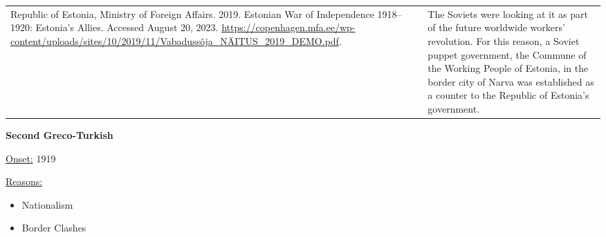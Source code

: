 {\begin{longtable}{p{}p{}}
\\
Republic of Estonia, Ministry of Foreign Affairs. 2019. Estonian War of Independence 1918–1920: Estonia’s Allies. Accessed August 20, 2023. \url{https://copenhagen.mfa.ee/wp-content/uploads/sites/10/2019/11/Vabadussõja_NÄITUS_2019_DEMO.pdf}. & The Soviets were looking at it as part of the future worldwide workers' revolution. For this reason, a Soviet puppet government, the Commune of the Working People of Estonia, in the border city of Narva was established as a counter to the Republic of Estonia's government.
\\
\end{longtable}}
\clearpage
         \textbf{Second Greco-Turkish} 

          \underline{Onset:} 1919         

\underline{Reasons:}
\begin{itemize}
\item Nationalism
\item Border Clashes
\end{itemize}

